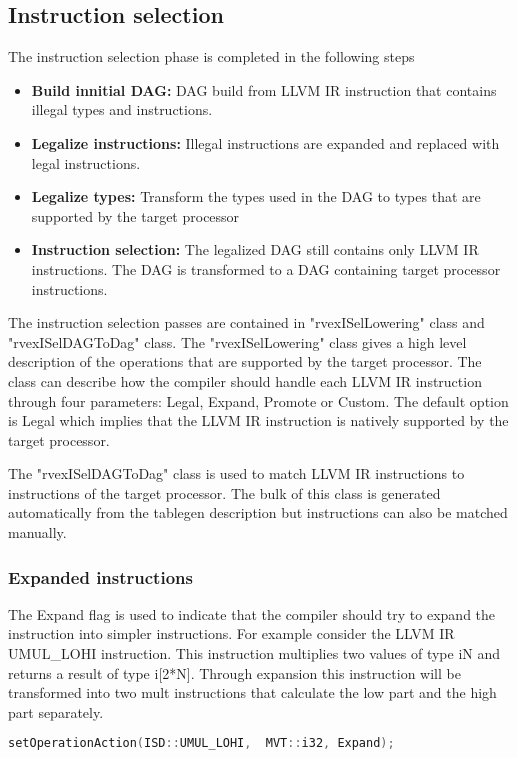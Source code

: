 \subsection{Instruction selection}
The instruction selection phase is completed in the following steps
\begin{itemize}
  \item \textbf{Build innitial DAG:} DAG build from LLVM IR instruction that contains illegal types and instructions.
  \item \textbf{Legalize instructions:} Illegal instructions are expanded and replaced with legal instructions.
  \item \textbf{Legalize types:} Transform the types used in the DAG to types that are supported by the target processor 
  \item \textbf{Instruction selection:} The legalized DAG still contains only LLVM IR instructions. The DAG is transformed to a DAG containing target processor instructions.
\end{itemize}

The instruction selection passes are contained in "rvexISelLowering" class and "rvexISelDAGToDag" class. The "rvexISelLowering" class gives a high level description of the operations that are supported by the target processor. The class can describe how the compiler should handle each LLVM IR instruction through four parameters: Legal, Expand, Promote or Custom. The default option is Legal which implies that the LLVM IR instruction is natively supported by the target processor.

The "rvexISelDAGToDag" class is used to match LLVM IR instructions to instructions of the target processor. The bulk of this class is generated automatically from the tablegen description but instructions can also be matched manually.

\subsubsection{Expanded instructions}
The Expand flag is used to indicate that the compiler should try to expand the instruction into simpler instructions. 
For example consider the LLVM IR UMUL\_LOHI instruction. This instruction multiplies two values of type iN and returns a result of type i[2*N]. Through expansion this instruction will be transformed into two mult instructions that calculate the low part and the high part separately.

\begin{lstlisting}[language=c] 
setOperationAction(ISD::UMUL_LOHI,  MVT::i32, Expand);
\end{lstlisting}


